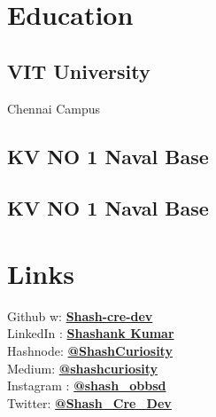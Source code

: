 \documentclass[]{deedy-resume-openfont}
\begin{document}
%
%
\lastupdated

%
%

%
%

\begin{minipage}[t]{0.33\textwidth} 


\section{Education} 
\subsection{VIT University}
Chennai Campus \\
\sectionsep

\subsection{KV NO 1 Naval Base}
\sectionsep

\subsection{KV NO 1 Naval Base}
\sectionsep




\section{Links} 
Github w: \href{https://github.com/Shash-cre-dev}{\bf Shash-cre-dev} \\
LinkedIn : \href{https://www.linkedin.com/in/shashank-kumar-4506b2243/}{\bf Shashank Kumar} \\
Hashnode: \href{https://hashnode.com/@ShashCuriosity}{\bf @ShashCuriosity} \\
Medium: \href{https://medium.com/@shashcuriosity}{\bf @shashcuriosity} \\
Instagram : \href{https://www.instagram.com/shash._.obssd_/}{\bf @shash\_obbsd} \\
Twitter:  \href{https://twitter.com/Shash_Cre_Dev}{\bf @Shash\_Cre\_Dev} \\



\end{minipage}
\end{document}
